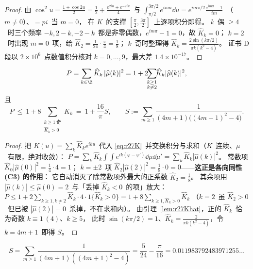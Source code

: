 \begin{proof}
由 $\cos^2u=\frac{1+\cos2u}2=\frac12+\frac{e^{2iu}+e^{-2iu}}4$~与
$\int_{\pi/2}^{3\pi/2}e^{imu}\dd u=e^{im\pi/2}\frac{e^{im\pi}-1}{im}$~（$m\ne0$）、$=pi$~当 $m=0$，
在 $K$~的支撑 $[\frac\pi2,\frac{3\pi}2]$~上逐项积分即得。
$k$~偶 $\ge4$~时三个频率 $-k,2-k,-2-k$~都是非零偶数，$e^{im\pi}-1=0$，故 $\widehat K_k=0$；
$k=2$~时出现 $m=0$~项，给 $\widehat K_2=\frac1{2\pi}\cdot\frac\pi4=\frac18$；
$k$~奇时整理得 $\widehat K_k=\frac{2\sin(k\pi/2)}{\pi k(k^2-4)}$。
证书 D 段以 $2\times10^6$~点数值积分核对 $k=0,\dots,9$，最大差 $1.4\times10^{-17}$。
\end{proof}

\begin{lemma}\label{lem:r27fourier}
\begin{equation}\label{eq:r27Pfourier}
P=\sum_{k\in\Z}\widehat K_k\,|\widehat\mu(k)|^2
=1+2\!\!\sum_{\substack{k\ge1\\ k\ne2}}\!\!\widehat K_k|\widehat\mu(k)|^2 ,
\end{equation}
且
\begin{equation}\label{eq:r27Pbound}
P\ \le\ 1+8\!\!\sum_{\substack{k\ge1\ \text{奇}\\ \widehat K_k>0}}\!\!\widehat K_k
\ =\ 1+\frac{16}\pi S,\qquad
S:=\sum_{m\ge1}\frac1{(4m+1)\bigl((4m+1)^2-4\bigr)} .
\end{equation}
\end{lemma}

\begin{proof}
把 $K(u)=\sum_k\widehat K_ke^{iku}$~代入 \eqref{eq:r27K}~并交换积分与求和（$K$~连续、$\mu$~有限，绝对收敛）：
$P=\sum_k\widehat K_k\int\!\!\int e^{ik(\varphi-\varphi')}\dd\mu\dd\mu'
=\sum_k\widehat K_k|\widehat\mu(k)|^2$。
常数项 $\widehat K_0|\widehat\mu(0)|^2=\frac14\cdot4=1$；
$k=\pm2$~项 $\widehat K_2|\widehat\mu(2)|^2=\frac18\cdot0=0$——\textbf{这正是各向同性 (C3) 的作用}：
它自动消灭了除常数项外最大的正系数 $\widehat K_2=\frac18$。
其余项用 $|\widehat\mu(k)|\le\widehat\mu(0)=2$~与「丢掉 $\widehat K_k<0$~的项」放大：
$P\le1+2\sum_{k\ge1,k\ne2}\widehat K_k\cdot4\cdot1\{\widehat K_k>0\}
=1+8\sum_{k\ge1,\widehat K_k>0}\widehat K_k$
（$k=2$~虽 $\widehat K_2>0$~但已被 $|\widehat\mu(2)|=0$~杀掉，不在求和内）。
由引理~\ref{lem:r27Khat}，正的 $\widehat K_k$~恰为奇数 $k\equiv1\ (4)$、$k\ge5$，
此时 $\sin(k\pi/2)=1$、$\widehat K_k=\frac2{\pi k(k^2-4)}$，令 $k=4m+1$~即得 $S$。
\end{proof}

\begin{lemma}[$S$~的闭式]\label{lem:r27S}
\begin{equation}\label{eq:r27S}
S=\sum_{m\ge1}\frac1{(4m+1)((4m+1)^2-4)}=\frac5{24}-\frac\pi{16}=0.011983792483971255\ldots
\end{equation}
\end{lemma}

